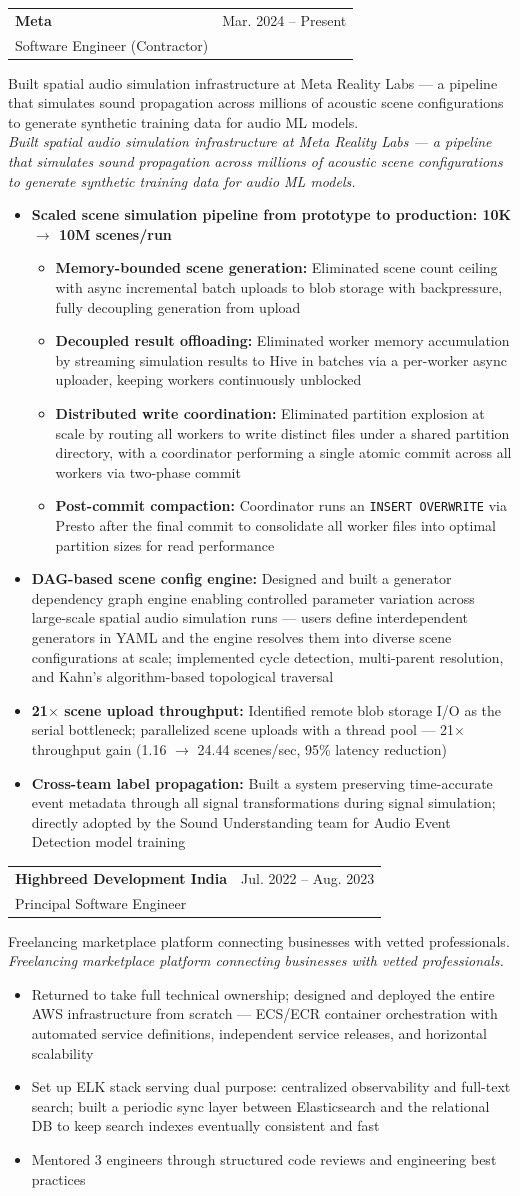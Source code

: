 \documentclass[letterpaper,10pt]{article}
\makeatletter
\newcommand{\resumeItem}[1]{
  \item\small{
    {#1 \vspace{-2pt}}
  }
}
\newcommand{\resumeSubheading}[5]{
  \vspace{-2pt}\item
    \begin{tabular*}{0.97\textwidth}[t]{l@{\extracolsep{\fill}}r}
      \textbf{#1} & #2 \\
      {\small#3} & {\small #4} \\
    \end{tabular*}
    \ifx\relax#5\relax\else\\\small\textit{#5}\fi\vspace{-5pt}
}
\newcommand{\resumeItemListStart}{\begin{itemize}[itemsep=4pt, parsep=0pt]}
\newcommand{\resumeItemListEnd}{\end{itemize}\vspace{-5pt}}
\newcommand{\resumeInnerItemListEnd}{\end{itemize}\vspace{-2pt}}
\makeatother
\begin{document}
    \resumeSubheading
    {Meta}{Mar. 2024 -- Present}
    {Software Engineer (Contractor)}{}
      {Built spatial audio simulation infrastructure at Meta Reality Labs --- a pipeline that simulates sound propagation across millions of acoustic scene configurations to generate synthetic training data for audio ML models.}
      \resumeItemListStart
        \resumeItem{\textbf{Scaled scene simulation pipeline from prototype to production: 10K $\rightarrow$ 10M scenes/run}}
        \resumeItemListStart
          \resumeItem{\textbf{Memory-bounded scene generation:} Eliminated scene count ceiling with async incremental batch uploads to blob storage with backpressure, fully decoupling generation from upload}
          \resumeItem{\textbf{Decoupled result offloading:} Eliminated worker memory accumulation by streaming simulation results to Hive in batches via a per-worker async uploader, keeping workers continuously unblocked}
          \resumeItem{\textbf{Distributed write coordination:} Eliminated partition explosion at scale by routing all workers to write distinct files under a shared partition directory, with a coordinator performing a single atomic commit across all workers via two-phase commit}
          \resumeItem{\textbf{Post-commit compaction:} Coordinator runs an \texttt{INSERT OVERWRITE} via Presto after the final commit to consolidate all worker files into optimal partition sizes for read performance}
        \resumeInnerItemListEnd
        \resumeItem{\textbf{DAG-based scene config engine:} Designed and built a generator dependency graph engine enabling controlled parameter variation across large-scale spatial audio simulation runs --- users define interdependent generators in YAML and the engine resolves them into diverse scene configurations at scale; implemented cycle detection, multi-parent resolution, and Kahn's algorithm-based topological traversal}
        \resumeItem{\textbf{21$\times$ scene upload throughput:} Identified remote blob storage I/O as the serial bottleneck; parallelized scene uploads with a thread pool --- 21$\times$ throughput gain (1.16 $\rightarrow$ 24.44 scenes/sec, 95\% latency reduction)}
        \resumeItem{\textbf{Cross-team label propagation:} Built a system preserving time-accurate event metadata through all signal transformations during signal simulation; directly adopted by the Sound Understanding team for Audio Event Detection model training}
      \resumeItemListEnd

    \resumeSubheading
      {Highbreed Development India}{Jul. 2022 -- Aug. 2023}
      {Principal Software Engineer}{}
      {Freelancing marketplace platform connecting businesses with vetted professionals.}
      \resumeItemListStart
        \resumeItem{Returned to take full technical ownership; designed and deployed the entire AWS infrastructure from scratch --- ECS/ECR container orchestration with automated service definitions, independent service releases, and horizontal scalability}
        \resumeItem{Set up ELK stack serving dual purpose: centralized observability and full-text search; built a periodic sync layer between Elasticsearch and the relational DB to keep search indexes eventually consistent and fast}
        \resumeItem{Mentored 3 engineers through structured code reviews and engineering best practices}
      \resumeItemListEnd
\end{document}
